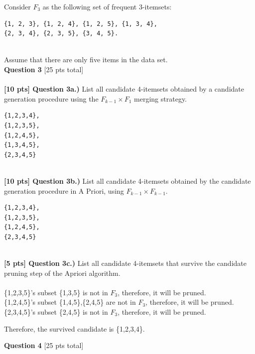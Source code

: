 \documentclass[paper=a4, fontsize=11pt]{scrartcl} %
\begin{document}
Consider $F_3$ as the following set of frequent 3-itemsets:

\begin{verbatim}
{1, 2, 3}, {1, 2, 4}, {1, 2, 5}, {1, 3, 4}, 
{2, 3, 4}, {2, 3, 5}, {3, 4, 5}.
\end{verbatim} \\

Assume that there are only five items in the data set. \\

{\Large \textbf{Question 3} [25 pts total]} \\
\\
\textbf{[10 pts] Question 3a.)} List all candidate 4-itemsets obtained by a candidate generation procedure using the $F_{k - 1} \times F_1$ merging strategy. 
\begin{verbatim}
{1,2,3,4}, 
{1,2,3,5},
{1,2,4,5},
{1,3,4,5},
{2,3,4,5}
\end{verbatim} 
\\

\textbf{[10 pts] Question 3b.)} List all candidate 4-itemsets obtained by the candidate generation procedure in A Priori, using $F_{k-1} \times F_{k-1}$. 
\begin{verbatim}
{1,2,3,4},
{1,2,3,5},
{1,2,4,5},
{2,3,4,5}
\end{verbatim} 
\\

\textbf{[5 pts] Question 3c.)} List all candidate 4-itemsets that survive the candidate pruning step of
the Apriori algorithm. \\
\\
\{1,2,3,5\}'s subset \{1,3,5\} is not in $F_3$, therefore, it will be pruned.\\
\{1,2,4,5\}'s subset \{1,4,5\},\{2,4,5\} are not in $F_3$, therefore, it will be pruned. \\
\{2,3,4,5\}'s subset \{2,4,5\} is not in $F_3$, therefore, it will be pruned.

Therefore, the survived candidate is \{1,2,3,4\}.


\vspace{10mm}

{\Large \textbf{Question 4} [25 pts total]} \\
 
\end{document}
